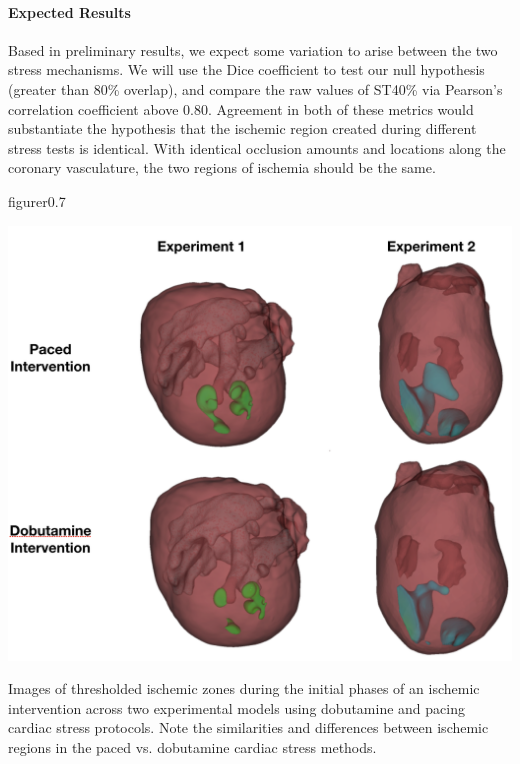 \paragraph{Expected Results} Based in preliminary results, we expect some
variation to arise between the two stress mechanisms.  We will use the Dice
coefficient to test our null hypothesis (greater than 80\% overlap), and
compare the raw values of ST40\% via Pearson's correlation
coefficient above 0.80. Agreement in both of these metrics would
substantiate the hypothesis that the ischemic region created during
different stress tests is identical. With identical occlusion amounts and
locations along the coronary vasculature, the two regions of ischemia
should be the same. 

\begin{wrapfloat}{figure}{r}{0.7\textwidth}
	\begin{center}
		{\includegraphics[width=.7\textwidth]
			{../Figures/DobutvsPacing.png}}
		\captionsetup{width = .7\textwidth}
		\caption{\small \label{fig:dobutPacingThreshold} Images of thresholded ischemic zones during the initial phases of an ischemic intervention across two experimental models using dobutamine and pacing cardiac stress protocols. Note the similarities and differences between ischemic regions in the paced vs. dobutamine cardiac stress methods. }
	\end{center}
\end{wrapfloat}

